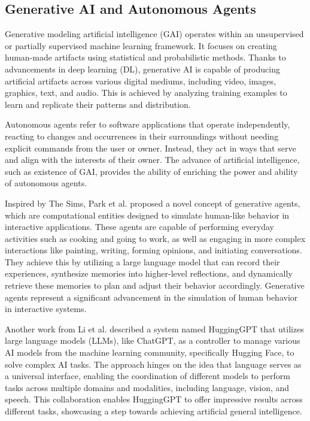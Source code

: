 \subsection{Generative AI and Autonomous Agents}

Generative modeling artificial intelligence (GAI) operates within an unsupervised or partially supervised machine learning framework. It focuses on creating human-made artifacts using statistical and probabilistic methods. Thanks to advancements in deep learning (DL), generative AI is capable of producing artificial artifacts across various digital mediums, including video, images, graphics, text, and audio. This is achieved by analyzing training examples to learn and replicate their patterns and distribution.\cite{baidoo2023education}

Autonomous agents refer to software applications that operate independently, reacting to changes and occurrences in their surroundings without needing explicit commands from the user or owner. Instead, they act in ways that serve and align with the interests of their owner. \cite{BOSSER20011002} The advance of artificial intelligence, such as existence of GAI, provides the ability of enriching the power and ability of autonomous agents. 

Inspired by The Sims, Park et al. \cite{10.1145/3586183.3606763} proposed a novel concept of generative agents, which are computational entities designed to simulate human-like behavior in interactive applications. These agents are capable of performing everyday activities such as cooking and going to work, as well as engaging in more complex interactions like painting, writing, forming opinions, and initiating conversations. They achieve this by utilizing a large language model that can record their experiences, synthesize memories into higher-level reflections, and dynamically retrieve these memories to plan and adjust their behavior accordingly. Generative agents represent a significant advancement in the simulation of human behavior in interactive systems. 

Another work from Li et al. \cite{shen2024hugginggpt} described a system named HuggingGPT that utilizes large language models (LLMs), like ChatGPT, as a controller to manage various AI models from the machine learning community, specifically Hugging Face, to solve complex AI tasks. The approach hinges on the idea that language serves as a universal interface, enabling the coordination of different models to perform tasks across multiple domains and modalities, including language, vision, and speech. This collaboration enables HuggingGPT to offer impressive results across different tasks, showcasing a step towards achieving artificial general intelligence. 

